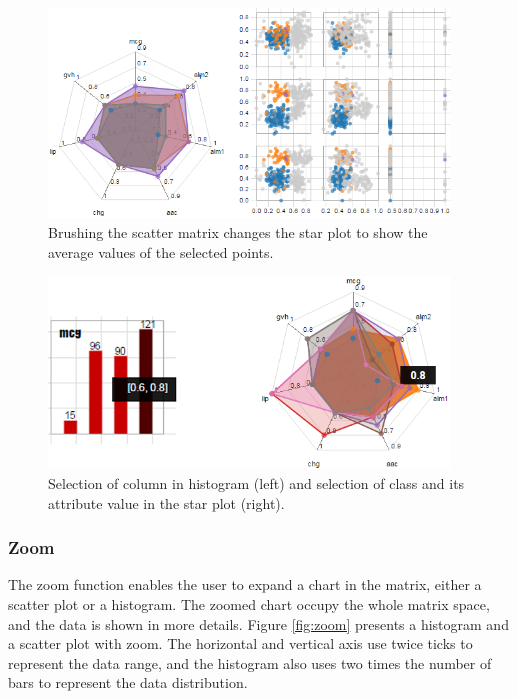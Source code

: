\documentclass[journal]{IEEEtran}
\begin{document}
\begin{figure}[!t]
  \centering
  \captionsetup{justification=centering}
  \includegraphics[width=4.2in]{images/selection_integrated}
  \caption{Brushing the scatter matrix changes the star plot to show the average values of the selected points.}
  \label{fig:selection_integrated}
\end{figure}

\begin{figure}[!t]
  \centering
  \captionsetup{justification=centering}
  \includegraphics[width=4.2in]{images/selection_parts}
  \caption{Selection of column in histogram (left) and selection of class and its attribute value in the star plot (right).}
  \label{fig:selection_parts}
\end{figure}

\subsubsection{Zoom}
The zoom function enables the user to expand a chart in the matrix, either a scatter plot or a histogram. The zoomed chart occupy the whole matrix space, and the data is shown in more details. Figure \ref{fig:zoom} presents a histogram and a scatter plot with zoom. The horizontal and vertical axis use twice ticks to represent the data range, and the histogram also uses two times the number of bars to represent the data distribution.
\end{document}
